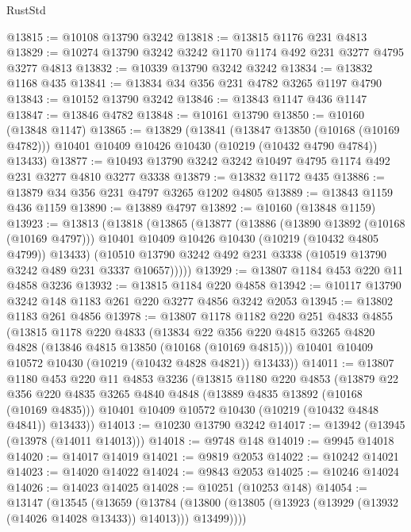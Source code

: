 \begin{lexlean}{RustStd}
\begin{coremodule}
@13815 := @10108 @13790 @3242
@13818 := @13815 @1176 @231 @4813
@13829 := @10274 @13790 @3242 @3242 @1170 @1174 @492 @231 @3277 @4795 @3277 @4813
@13832 := @10339 @13790 @3242 @3242
@13834 := @13832 @1168 @435
@13841 := @13834 @34 @356 @231 @4782 @3265 @1197 @4790
@13843 := @10152 @13790 @3242
@13846 := @13843 @1147 @436 @1147
@13847 := @13846 @4782
@13848 := @10161 @13790
@13850 := @10160 (@13848 @1147)
@13865 := @13829
    (@13841
      (@13847 @13850 (@10168 (@10169 @4782)))
      @10401
      @10409
      @10426
      @10430
      (@10219 (@10432 @4790 @4784))
      @13433)
@13877 := @10493 @13790 @3242 @3242 @10497 @4795 @1174 @492 @231 @3277 @4810 @3277 @3338
@13879 := @13832 @1172 @435
@13886 := @13879 @34 @356 @231 @4797 @3265 @1202 @4805
@13889 := @13843 @1159 @436 @1159
@13890 := @13889 @4797
@13892 := @10160 (@13848 @1159)
@13923 := @13813
    (@13818
      (@13865
        (@13877
          (@13886
            (@13890 @13892 (@10168 (@10169 @4797)))
            @10401
            @10409
            @10426
            @10430
            (@10219 (@10432 @4805 @4799))
            @13433)
          (@10510 @13790 @3242 @492 @231 @3338 (@10519 @13790 @3242 @489 @231 @3337 @10657)))))
@13929 := @13807 @1184 @453 @220 @11 @4858 @3236
@13932 := @13815 @1184 @220 @4858
@13942 := @10117 @13790 @3242 @148 @1183 @261 @220 @3277 @4856 @3242 @2053
@13945 := @13802 @1183 @261 @4856
@13978 := @13807
    @1178
    @1182
    @220
    @251
    @4833
    @4855
    (@13815
      @1178
      @220
      @4833
      (@13834
        @22
        @356
        @220
        @4815
        @3265
        @4820
        @4828
        (@13846 @4815 @13850 (@10168 (@10169 @4815)))
        @10401
        @10409
        @10572
        @10430
        (@10219 (@10432 @4828 @4821))
        @13433))
@14011 := @13807
    @1180
    @453
    @220
    @11
    @4853
    @3236
    (@13815
      @1180
      @220
      @4853
      (@13879
        @22
        @356
        @220
        @4835
        @3265
        @4840
        @4848
        (@13889 @4835 @13892 (@10168 (@10169 @4835)))
        @10401
        @10409
        @10572
        @10430
        (@10219 (@10432 @4848 @4841))
        @13433))
@14013 := @10230 @13790 @3242
@14017 := @13942 (@13945 (@13978 (@14011 @14013)))
@14018 := @9748 @148
@14019 := @9945 @14018
@14020 := @14017 @14019
@14021 := @9819 @2053
@14022 := @10242 @14021
@14023 := @14020 @14022
@14024 := @9843 @2053
@14025 := @10246 @14024
@14026 := @14023 @14025
@14028 := @10251 (@10253 @148)
@14054 := @13147
    (@13545
      (@13659
        (@13784 (@13800 (@13805 (@13923 (@13929 (@13932 (@14026 @14028 @13433)) @14013))) @13499))))

\end{coremodule}
\end{lexlean}

